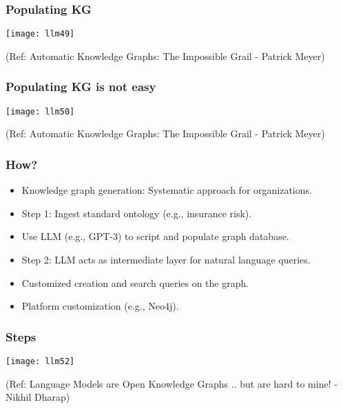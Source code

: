 \begin{frame}[fragile]\frametitle{Populating KG}

\begin{center}
\texttt{[image: llm49]}
\end{center}

{\tiny (Ref: Automatic Knowledge Graphs: The Impossible Grail - Patrick Meyer)}

\end{frame}

\begin{frame}[fragile]\frametitle{Populating KG is not easy}

\begin{center}
\texttt{[image: llm50]}
\end{center}

{\tiny (Ref: Automatic Knowledge Graphs: The Impossible Grail - Patrick Meyer)}

\end{frame}

\begin{frame}[fragile]\frametitle{How?}

\begin{itemize}
\item Knowledge graph generation: Systematic approach for organizations.
\item Step 1: Ingest standard ontology (e.g., insurance risk).
\item Use LLM (e.g., GPT-3) to script and populate graph database.
\item Step 2: LLM acts as intermediate layer for natural language queries.
\item Customized creation and search queries on the graph.
\item Platform customization (e.g., Neo4j).
\end{itemize}
\end{frame}

\begin{frame}[fragile]\frametitle{Steps}

\begin{center}
\texttt{[image: llm52]}
\end{center}	

{\tiny (Ref: Language Models are Open Knowledge Graphs .. but are hard to mine! - Nikhil Dharap)}
\end{frame}



